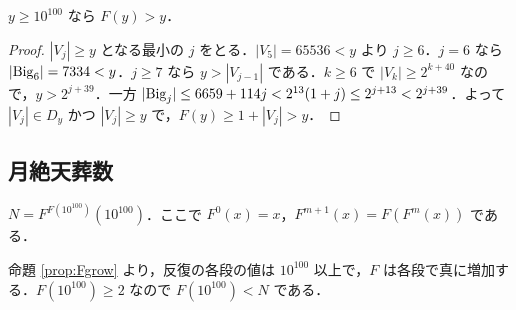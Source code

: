\begin{proposition}\label{prop:Fgrow}
$y\ge 10^{100}$ なら $F(y)>y$．
\end{proposition}
\begin{proof}
$|V_j|\ge y$ となる最小の $j$ をとる．$|V_5|=65536<y$ より $j\ge 6$．$j=6$ なら $|\mathrm{Big}_6|=7334<y$．$j\ge 7$ なら $y>|V_{j-1}|$ である．$k\ge 6$ で $|V_k|\ge 2^{k+40}$ なので，$y>2^{j+39}$．一方 $|\mathrm{Big}_j|\le 6659+114j<2^{13}(1+j)\le 2^{j+13}<2^{j+39}$．よって $|V_j|\in D_y$ かつ $|V_j|\ge y$ で，$F(y)\ge 1+|V_j|>y$．
\end{proof}

\subsection{月絶天葬数}
\begin{definition}
$N = F^{F(10^{100})}(10^{100})$．ここで $F^0(x)=x$，$F^{m+1}(x)=F(F^m(x))$ である．
\end{definition}
命題 \ref{prop:Fgrow} より，反復の各段の値は $10^{100}$ 以上で，$F$ は各段で真に増加する．$F(10^{100})\ge 2$ なので $F(10^{100})<N$ である．
